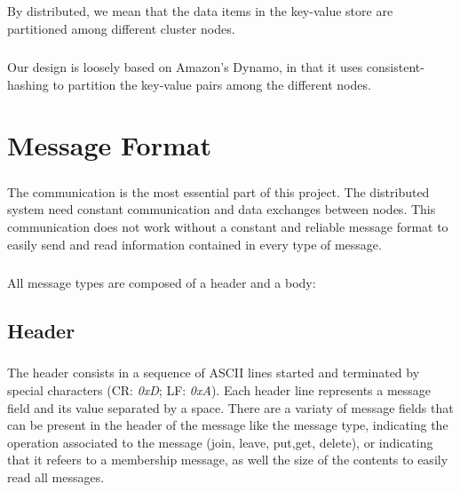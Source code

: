 \documentclass{report}
\begin{document}
			\paragraph{}By distributed, we mean that the data items in the key-value
			store are partitioned among different cluster nodes.
			
			\paragraph{} Our design is loosely based on Amazon's Dynamo, in that it
			uses consistent-hashing to partition the key-value pairs among the 
			different nodes.
	
	\chapter{Message Format}

			\paragraph{} The communication is the most essential part of this project. The
			distributed system need constant communication and data exchanges between nodes.
			This communication does not work without a constant and reliable message format
			to easily send and read information contained in every type of message.
			
			\paragraph{} All message types are composed of a header and a body:
	        	
	        
	        \section{Header}
	
				\paragraph{} The header consists in a sequence of ASCII lines started and
				terminated by special characters (CR: \emph{0xD}; LF: \emph{0xA}). Each
				header line represents a message field and its value separated by a space.
				There are a variaty of message fields that can be present in the header of
				the message like the message type, indicating the operation associated to the
				message (join, leave, put,get, delete), or indicating that it refeers to a 
				membership message, as well the size of the contents to easily read all messages.
			
\end{document}
